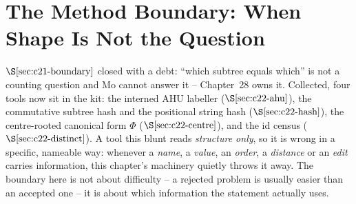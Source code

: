 \section{The Method Boundary: When Shape Is Not the Question}\label{sec:c22-boundary}

\begin{previouslybox}
\(\secref{c21-boundary}\) closed with a debt: ``which subtree equals which'' is not a
counting question and Mo cannot answer it -- Chapter~28 owns it.  Collected, four
tools now sit in the kit: the interned AHU labeller (\(\secref{c22-ahu}\)), the
commutative subtree hash and the positional string hash (\(\secref{c22-hash}\)), the
centre-rooted canonical form \(\Phi\) (\(\secref{c22-centre}\)), and the id census
(\(\secref{c22-distinct}\)).  A tool this blunt reads \emph{structure only}, so it is
wrong in a specific, nameable way: whenever a \emph{name}, a \emph{value}, an
\emph{order}, a \emph{distance} or an \emph{edit} carries information, this chapter's
machinery quietly throws it away.  The boundary here is not about difficulty -- a
rejected problem is usually easier than an accepted one -- it is about which
information the statement actually uses.
\end{previouslybox}

